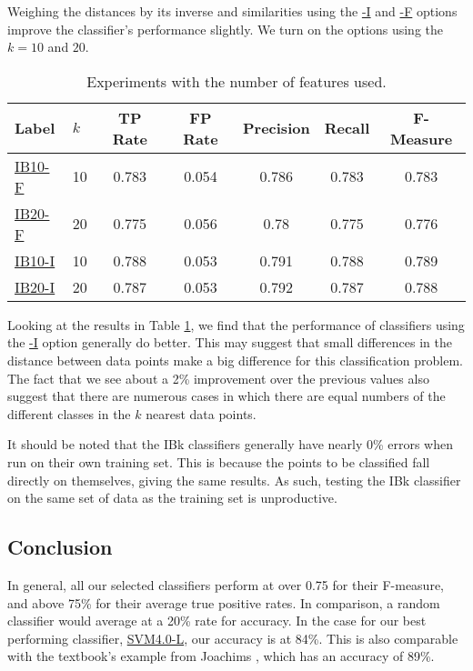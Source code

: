 \documentclass[12pt]{article}
\begin{document}
Weighing the distances by its inverse and similarities using the \url{-I} and \url{-F} options improve the classifier's performance slightly. We turn on the options using the $k=10$ and $20$.
\begin{table}[h]
\linespread{1}
\centering
\begin{tabular}{|l |l|c c c c c|}
\hline
Label & $k$ &	TP Rate & FP Rate & Precision & Recall  & F-Measure	 \\
\hline
\url{IB10-F} & 10  &	0.783  &	   0.054  &	    0.786  &	   0.783  &	   0.783\\
\url{IB20-F} & 20 &		0.775  &	   0.056  &	    0.78   &	   0.775  &	   0.776\\
\url{IB10-I} & 10 &		0.788  &	   0.053  &	    0.791  &	   0.788  &	   0.789\\ 
\url{IB20-I} & 20 &		0.787  &	   0.053  &	    0.792  &	   0.787  &	   0.788\\ 

\hline
\end{tabular}
\caption{Experiments with the number of features used.}
\label{table:knn-l}
\end{table}

Looking at the results in Table \ref{table:knn-l}, we find that the performance of classifiers using the \url{-I} option generally do better. This may suggest that small differences in the distance between data points make a big difference for this classification problem. The fact that we see about a 2\% improvement over the previous values also suggest that there are numerous cases in which there are equal numbers of the different classes in the $k$ nearest data points. 

It should be noted that the IBk classifiers generally have nearly 0\% errors when run on their own training set. This is because the points to be classified fall directly on themselves, giving the same results. As such, testing the IBk classifier on the same set of data as the training set is unproductive.

\subsection{Conclusion}
In general, all our selected classifiers perform at over 0.75 for their F-measure, and above 75\% for their average true positive rates. In comparison, a random classifier would average at a 20\% rate for accuracy. In the case for our best performing classifier, \url{SVM4.0-L}, our accuracy is at 84\%. This is also comparable with the textbook's example from Joachims %
, which has an accuracy of 89\%.
\end{document}

